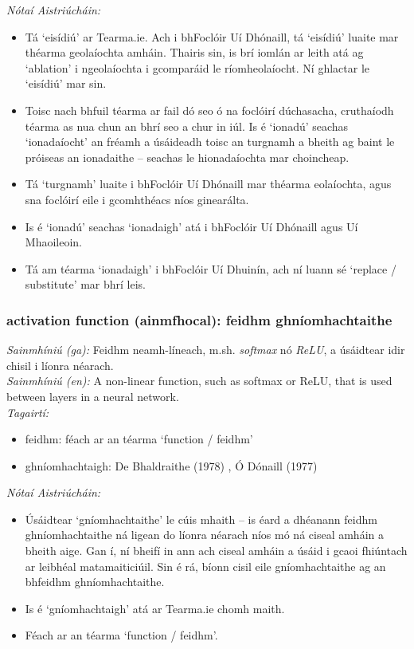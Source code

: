  \noindent \textit{Nótaí Aistriúcháin:}
\begin{itemize}
	\item Tá `eisídiú' ar Tearma.ie. Ach i bhFoclóir Uí Dhónaill, tá `eisídiú' luaite mar théarma geolaíochta amháin. Thairis sin, is brí iomlán ar leith atá ag `ablation' i ngeolaíochta i gcomparáid le ríomheolaíocht. Ní ghlactar le `eisídiú' mar sin.
	\item Toisc nach bhfuil téarma ar fail dó seo ó na foclóirí dúchasacha, cruthaíodh téarma as nua chun an bhrí seo a chur in iúl. Is é `ionadú' seachas `ionadaíocht' an fréamh a úsáideadh toisc an turgnamh a bheith ag baint le próiseas an ionadaithe -- seachas le hionadaíochta mar choincheap.
	\item Tá `turgnamh' luaite i bhFoclóir Uí Dhónaill mar théarma eolaíochta, agus sna foclóirí eile i gcomhthéacs níos ginearálta.
	\item Is é `ionadú' seachas `ionadaigh' atá i bhFoclóir Uí Dhónaill agus Uí Mhaoileoin.
	\item Tá am téarma `ionadaigh' i bhFoclóir Uí Dhuinín, ach ní luann sé `replace / substitute' mar bhrí leis.
\end{itemize}


\subsubsection*{activation function (ainmfhocal): feidhm ghníomhachtaithe}
 \noindent \textit{Sainmhíniú (ga):} Feidhm neamh-líneach, m.sh.  \noindent \textit{softmax} nó  \noindent \textit{ReLU}, a úsáidtear idir chisil i líonra néarach.
\\
 \noindent \textit{Sainmhíniú (en):} A non-linear function, such as softmax or ReLU, that is used between layers in a neural network.
\\
 \noindent \textit{Tagairtí:}
\begin{itemize}
	\item feidhm: féach ar an téarma `function / feidhm'
	\item ghníomhachtaigh: De Bhaldraithe (1978) \cite{de-bhaldraithe}, Ó Dónaill (1977) \cite{odonaill}
\end{itemize}

 \noindent \textit{Nótaí Aistriúcháin:}
\begin{itemize}
	\item Úsáidtear `gníomhachtaithe' le cúis mhaith -- is éard a dhéanann feidhm ghníomhachtaithe ná ligean do líonra néarach níos mó ná ciseal amháin a bheith aige. Gan í, ní bheifí in ann ach ciseal amháin a úsáid i gcaoi fhiúntach ar leibhéal matamaiticiúil. Sin é rá, bíonn cisil eile gníomhachtaithe ag an bhfeidhm ghníomhachtaithe.
	\item Is é `gníomhachtaigh' atá ar Tearma.ie chomh maith.
	\item Féach ar an téarma `function / feidhm'.
\end{itemize}


